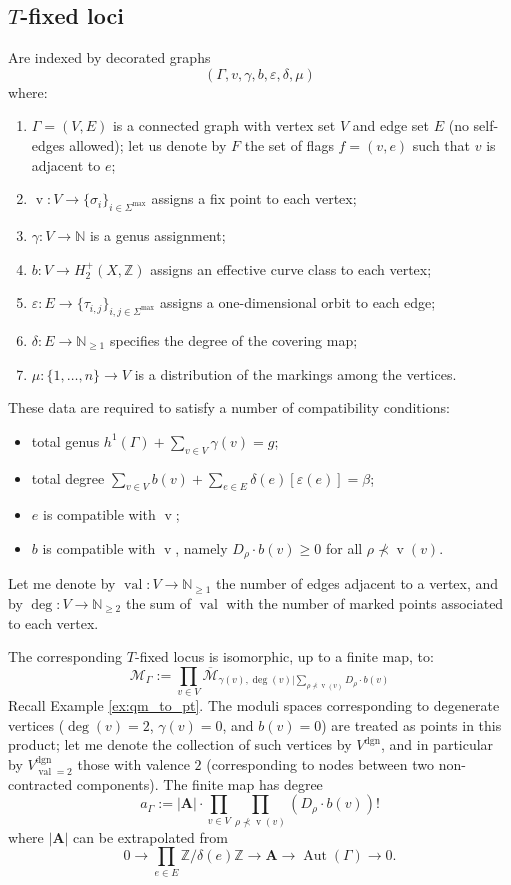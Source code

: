 \documentclass[11pt]{amsart}
\newcommand{\N}{\mathbb{N}}
\renewcommand{\to}{\rightarrow}
\newcommand{\val}{\operatorname{val}}
\newcommand{\ZZ}{\mathbb{Z}}
\newcommand{\vv}{\operatorname{v}}
\newcommand{\Aut}{\operatorname{Aut}}
\theoremstyle{definition}
\theoremstyle{definition}
\begin{document}
\subsection{$T$-fixed loci} Are indexed by decorated graphs
\[ \left(\Gamma, v, \gamma, b,\varepsilon,\delta,\mu\right) \]
where:
\begin{enumerate}
 \item $\Gamma=(V,E)$ is a connected graph with vertex set $V$ and edge set $E$ (no self-edges allowed); let us denote by $F$ the set of flags $f=(v,e)$ such that $v$ is adjacent to $e$;
 \item $\vv\colon V\to \{\sigma_i\}_{i\in\Sigma^\text{max}}$ assigns a fix point to each vertex;
 \item $\gamma\colon V\to \N$ is a genus assignment;
 \item $b\colon V\to H^+_2(X,\ZZ)$ assigns an effective curve class to each vertex;
 \item $\varepsilon\colon E\to \{\tau_{i,j}\}_{i,j\in\Sigma^\text{max}}$ assigns a one-dimensional orbit to each edge;
 \item $\delta\colon E\to \N_{\geq1}$ specifies the degree of the covering map;
 \item $\mu\colon \{1,\ldots,n\}\to V$ is a distribution of the markings among the vertices.
\end{enumerate}
These data are required to satisfy a number of compatibility conditions:
\begin{itemize}
 \item total genus $h^1(\Gamma)+\sum_{v\in V} \gamma(v)=g$;
 \item total degree $\sum_{v\in V}b(v)+\sum_{e\in E}\delta(e)[\varepsilon(e)]=\beta$;
 \item $e$ is compatible with $\vv$;
 \item $b$ is compatible with $\vv$, namely $D_\rho\cdot b(v) \geq 0$ for all $\rho\nprec \vv(v)$.

 \end{itemize}
Let me denote by $\val\colon V\to\N_{\geq1}$ the number of edges adjacent to a vertex, and by $\deg\colon V\to\N_{\geq2}$ the sum of $\val$ with the number of marked points associated to each vertex.

The corresponding $T$-fixed locus is isomorphic, up to a finite map, to:
\[
 \mathcal M_\Gamma:= \prod_{v\in V} \overline{\mathcal M}_{\gamma(v),\deg(v)|\sum_{\rho\nprec \vv(v)}D_\rho\cdot b(v)}
\]
Recall Example \ref{ex:qm_to_pt}. The moduli spaces corresponding to degenerate vertices ($\deg(v)=2$, $\gamma(v)=0$, and $b(v)=0$) are treated as points in this product; let me denote the collection of such vertices by $V^{\text{dgn}}$, and in particular by $V^{\text{dgn}}_{\val=2}$ those with valence $2$ (corresponding to nodes between two non-contracted components). The finite map has degree \[a_\Gamma:=|\mathbf A|\cdot\prod_{v\in V}\prod_{\rho\nprec\vv(v)}(D_\rho\cdot b(v))!\] where $|\mathbf A|$ can be extrapolated from
\[
 0\to\prod_{e\in E}\ZZ/\delta(e)\ZZ\to \mathbf A\to \Aut(\Gamma)\to 0.
\]
\end{document}
